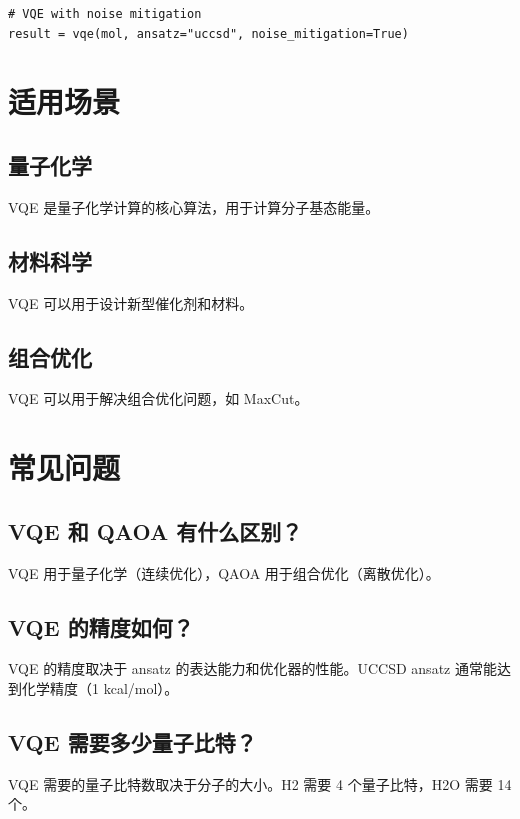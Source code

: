 \documentclass[12pt,a4paper]{article}
\begin{document}
\begin{lstlisting}[style=python]
# VQE with noise mitigation
result = vqe(mol, ansatz="uccsd", noise_mitigation=True)
\end{lstlisting}

\section{适用场景}

\subsection{量子化学}

VQE 是量子化学计算的核心算法，用于计算分子基态能量。

\subsection{材料科学}

VQE 可以用于设计新型催化剂和材料。

\subsection{组合优化}

VQE 可以用于解决组合优化问题，如 MaxCut。

\section{常见问题}

\subsection{VQE 和 QAOA 有什么区别？}

VQE 用于量子化学（连续优化），QAOA 用于组合优化（离散优化）。

\subsection{VQE 的精度如何？}

VQE 的精度取决于 ansatz 的表达能力和优化器的性能。UCCSD ansatz 通常能达到化学精度（1 kcal/mol）。

\subsection{VQE 需要多少量子比特？}

VQE 需要的量子比特数取决于分子的大小。H2 需要 4 个量子比特，H2O 需要 14 个。
\end{document}
